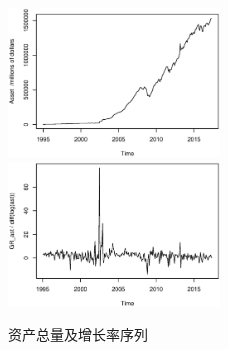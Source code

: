 \documentclass[10.5pt,onecolumn,a4paper]{article}%
\begin{document}
\begin{figure}[h!]
    \caption{资产总量及增长率序列} \label{fg:adf1}
    \includegraphics[width=0.5\textwidth]{pic/ast.eps}
    \includegraphics[width=0.5\textwidth]{pic/gr_ast.eps}
\end{figure}
\end{document}
